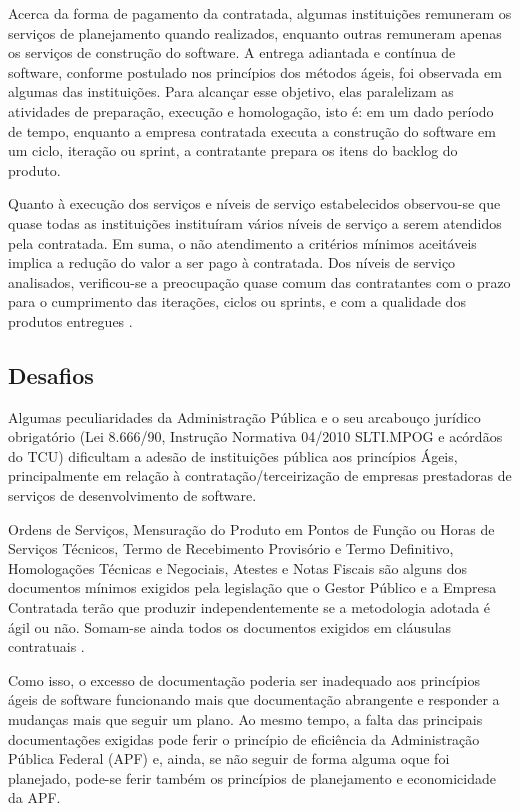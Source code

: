 Acerca da forma de pagamento da contratada, algumas instituições remuneram os serviços de planejamento quando realizados, enquanto outras remuneram apenas os serviços de construção do software. A entrega adiantada e contínua de software, conforme postulado nos princípios dos métodos ágeis, foi observada em algumas das instituições. Para alcançar esse objetivo, elas paralelizam as atividades de preparação, execução e homologação, isto é: em um dado período de tempo, enquanto a empresa contratada executa a construção do software em um ciclo, iteração ou sprint, a contratante prepara os itens do backlog do produto. 

Quanto à execução dos serviços e níveis de serviço estabelecidos observou-se que quase todas as instituições instituíram vários níveis de serviço a serem atendidos pela contratada. Em suma, o não atendimento a critérios mínimos aceitáveis implica a redução do valor a ser pago à contratada. Dos níveis de serviço analisados, verificou-se a preocupação quase comum das contratantes com o prazo para o cumprimento das iterações, ciclos ou sprints, e com a qualidade dos produtos entregues  \cite{TCU:2013}.

\subsection[Desafios]{Desafios}

Algumas peculiaridades da Administração Pública e o seu arcabouço jurídico obrigatório (Lei 8.666/90, Instrução Normativa 04/2010 SLTI.MPOG e acórdãos do TCU) dificultam a adesão de instituições pública aos princípios Ágeis, principalmente em relação à contratação/terceirização de empresas prestadoras de serviços de desenvolvimento de software.

Ordens de Serviços, Mensuração do Produto em Pontos de Função ou Horas de Serviços Técnicos, Termo de Recebimento Provisório e Termo Definitivo, Homologações Técnicas e Negociais, Atestes e Notas Fiscais são alguns dos documentos mínimos exigidos pela legislação que o Gestor Público e a Empresa Contratada terão que produzir independentemente se a metodologia adotada é ágil ou não. Somam-se ainda todos os documentos exigidos em cláusulas contratuais   \cite{agilebrazil}. 

Como isso, o excesso de documentação poderia ser inadequado aos princípios ágeis de software funcionando mais que documentação abrangente e responder a mudanças mais que seguir um plano. Ao mesmo tempo, a falta das principais documentações exigidas pode ferir o princípio de eficiência da Administração Pública Federal (APF) e, ainda, se não seguir de forma alguma oque foi  planejado, pode-se ferir também os princípios de planejamento e economicidade da APF. 

